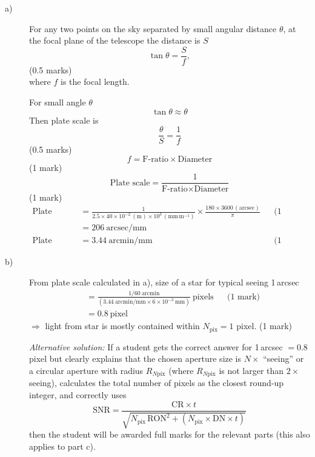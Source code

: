 \begin{description}
\item[a)]
For any two points on the sky separated by small angular distance $\theta$,
at the focal plane of the telescope the distance is $S$
\[ \tan\theta = \frac{S}{f}, \]
\hfill(0.5 marks)\\
where $f$ is the focal length.

For small angle $\theta$
\[ \tan\theta \approx \theta \]
Then plate scale is
\[ \frac{\theta}{S} = \frac{1}{f} \]
\hfill(0.5 marks)
\[ f = \text{F-ratio} \times \text{Diameter} \]
\hfill(1 mark)
\[ \text{Plate scale} = \frac{1}{\text{F-ratio} \times \text{Diameter}} \]
\hfill(1 mark)
\begin{align*}
\text{Plate Scale}
  &= \frac{1}{2.5 \times 40 \times 10^{-2}\,(\mathrm{m})
     \times 10^{3}\,(\mathrm{mm\,m^{-1}})}
     \times \frac{180 \times 3600\,(\mathrm{arcsec})}{\pi}
  && \text{(1 mark)} \\
  &= 206~\mathrm{arcsec/mm} \\
\text{Plate Scale} &= 3.44~\mathrm{arcmin/mm}
  && \text{(1 mark)}
\end{align*}

\item[b)]
From plate scale calculated in a), size of a star for typical seeing 1\,arcsec
\begin{align*}
  &= \frac{1/60~\mathrm{arcmin}}
     {\left(3.44~\mathrm{arcmin/mm} \times 6 \times 10^{-3}~\mathrm{mm}\right)}
     ~\text{pixels}
  && \text{(1 mark)} \\
  &= 0.8~\text{pixel}
\end{align*}
$\Rightarrow$ light from star is mostly contained within
$N_{\mathrm{pix}} = 1$ pixel. \hfill(1 mark)

\emph{Alternative solution:} If a student gets the correct answer for
1\,arcsec $= 0.8$ pixel but clearly explains that the chosen aperture size is
$N \times$ ``seeing'' or a circular aperture with radius $R_{N\mathrm{pix}}$
(where $R_{N\mathrm{pix}}$ is not larger than $2\times$ seeing), calculates
the total number of pixels as the closest round-up integer, and correctly uses
\[ \mathrm{SNR} = \frac{\mathrm{CR} \times t}
   {\sqrt{N_{\mathrm{pix}}\,\mathrm{RON}^2
    + (N_{\mathrm{pix}} \times \mathrm{DN} \times t)}} \]
then the student will be awarded full marks for the relevant parts (this
also applies to part c).


\end{description}
